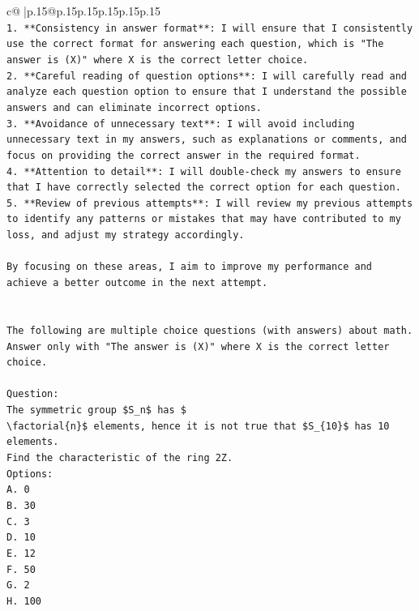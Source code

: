 \documentclass{article}
\begin{document}
{\begin{supertabular}{c@{$\;$}|p{.15\linewidth}@{}p{.15\linewidth}p{.15\linewidth}p{.15\linewidth}p{.15\linewidth}p{.15\linewidth}}
{{{\\ 
\texttt{1. **Consistency in answer format**: I will ensure that I consistently use the correct format for answering each question, which is "The answer is (X)" where X is the correct letter choice.} \\
\texttt{2. **Careful reading of question options**: I will carefully read and analyze each question option to ensure that I understand the possible answers and can eliminate incorrect options.} \\
\texttt{3. **Avoidance of unnecessary text**: I will avoid including unnecessary text in my answers, such as explanations or comments, and focus on providing the correct answer in the required format.} \\
\texttt{4. **Attention to detail**: I will double{-}check my answers to ensure that I have correctly selected the correct option for each question.} \\
\texttt{5. **Review of previous attempts**: I will review my previous attempts to identify any patterns or mistakes that may have contributed to my loss, and adjust my strategy accordingly.} \\
\\ 
\texttt{By focusing on these areas, I aim to improve my performance and achieve a better outcome in the next attempt.} \\
\\ 
\\ 
\texttt{The following are multiple choice questions (with answers) about math. Answer only with "The answer is (X)" where X is the correct letter choice.} \\
\\ 
\texttt{Question:} \\
\texttt{The symmetric group \$S\_n\$ has \$} \\
\texttt{\textbackslash{}factorial\{n\}\$ elements, hence it is not true that \$S\_\{10\}\$ has 10 elements.} \\
\texttt{Find the characteristic of the ring 2Z.} \\
\texttt{Options:} \\
\texttt{A. 0} \\
\texttt{B. 30} \\
\texttt{C. 3} \\
\texttt{D. 10} \\
\texttt{E. 12} \\
\texttt{F. 50} \\
\texttt{G. 2} \\
\texttt{H. 100} \\
}}}
\end{supertabular}}
\end{document}

